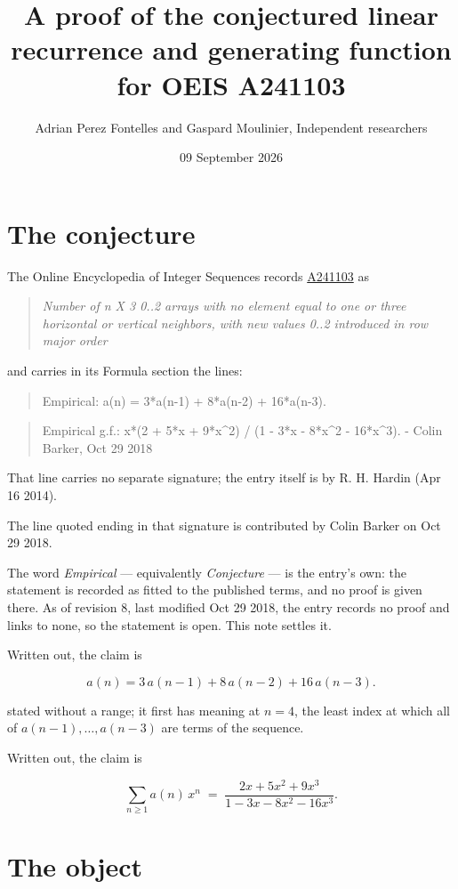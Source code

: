 \documentclass[11pt]{article}
\title{A proof of the conjectured linear recurrence and generating function for OEIS A241103}
\author{Adrian Perez Fontelles and Gaspard Moulinier, Independent researchers}
\date{09 September 2026}
\theoremstyle{definition}
\begin{document}
\maketitle
\section{The conjecture}

The Online Encyclopedia of Integer Sequences records \href{https://oeis.org/A241103}{A241103} as

\begin{quote}\itshape Number of n X 3 0..2 arrays with no element equal to one or three horizontal or vertical neighbors, with new values 0..2 introduced in row major order\end{quote}

and carries in its Formula section the lines:

\begin{quote}\ttfamily Empirical: a(n) = 3*a(n-1) + 8*a(n-2) + 16*a(n-3).\end{quote}

\begin{quote}\ttfamily Empirical g.f.: x*(2 + 5*x + 9*x\textasciicircum{}2) / (1 - 3*x - 8*x\textasciicircum{}2 - 16*x\textasciicircum{}3). - Colin Barker, Oct 29 2018\end{quote}

That line carries no separate signature; the entry itself is by R. H. Hardin (Apr 16 2014).

The line quoted ending in that signature is contributed by Colin Barker on Oct 29 2018.

The word {\itshape Empirical} --- equivalently {\itshape Conjecture} --- is the entry's own: the statement is recorded as fitted to the published terms, and no proof is given there. As of revision 8, last modified Oct 29 2018, the entry records no proof and links to none, so the statement is open. This note settles it.

Written out, the claim is

\[a(n) = 3\,a(n-1) + 8\,a(n-2) + 16\,a(n-3).\]

stated without a range; it first has meaning at $n = 4$, the least index at which all of $a(n-1),\dots,a(n-3)$ are terms of the sequence.

Written out, the claim is

\[\sum_{n \ge 1} a(n)\,x^n \;=\; \frac{2x + 5x^{2} + 9x^{3}}{1 - 3x - 8x^{2} - 16x^{3}}.\]

\section{The object}
\end{document}
